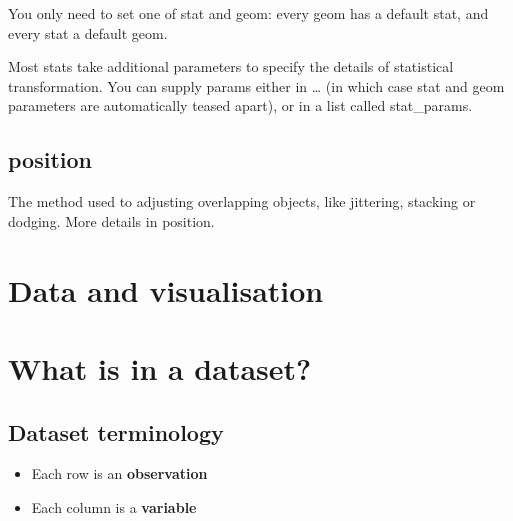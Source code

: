 \documentclass[
]{book}
\providecommand{\tightlist}{%
  \setlength{\itemsep}{0pt}\setlength{\parskip}{0pt}}
\theoremstyle{definition}
\theoremstyle{definition}
\theoremstyle{definition}
\theoremstyle{definition}
\theoremstyle{remark}
\begin{document}
You only need to set one of stat and geom: every geom has a default stat, and every stat a default geom.

Most stats take additional parameters to specify the details of statistical transformation. You can supply params either in \ldots{} (in which case stat and geom parameters are automatically teased apart), or in a list called stat\_params.

\hypertarget{position}{%
\section{position}\label{position}}

The method used to adjusting overlapping objects, like jittering, stacking or dodging. More details in position.

\hypertarget{data-and-visualisation}{%
\chapter{Data and visualisation}\label{data-and-visualisation}}

\hypertarget{what-is-in-a-dataset}{%
\chapter{What is in a dataset?}\label{what-is-in-a-dataset}}

\hypertarget{dataset-terminology}{%
\section{Dataset terminology}\label{dataset-terminology}}

\begin{itemize}
\tightlist
\item
  Each row is an \textbf{observation}
\item
  Each column is a \textbf{variable}
\end{itemize}
\end{document}
